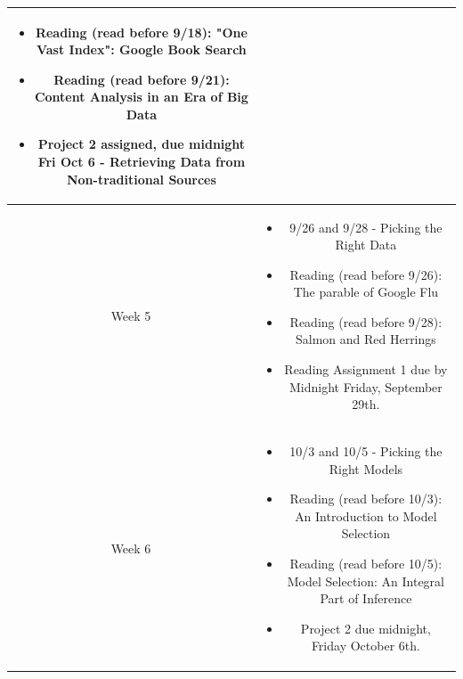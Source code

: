 \documentclass[11pt]{article}
\begin{document}
\begin{table}[h!]
\begin{tabular}{ | c | c | }
\begin{minipage}{.85\textwidth}
\begin{itemize}
	\item Reading (read before 9/18): "One Vast Index": Google Book Search 
	\item Reading (read before 9/21): Content Analysis in an Era of Big Data
		
	\item Project 2 assigned, due midnight Fri Oct 6 -  Retrieving Data from Non-traditional Sources
	\vspace{1mm}
\end{itemize}
\end{minipage} \\
\hline

Week 5 & \begin{minipage}{.85\textwidth}
\begin{itemize} \itemsep-0.4em
	\vspace{1mm}
	\item 9/26 and 9/28 - Picking the Right Data 
	
	\item Reading (read before 9/26): The parable of Google Flu
	\item Reading (read before 9/28): Salmon and Red Herrings
	

	\item Reading Assignment 1 due by Midnight Friday, September 29th.

	\vspace{1mm}
\end{itemize}
\end{minipage} \\
\hline


Week 6 & \begin{minipage}{.85\textwidth}
\begin{itemize} \itemsep-0.4em
	\vspace{1mm}
	\item 10/3 and 10/5 - Picking the Right Models

	\item Reading (read before 10/3): An Introduction to Model Selection
	\item Reading (read before 10/5): Model Selection: An Integral Part of Inference
	
	\item Project 2 due midnight, Friday October 6th.
	
	
	\vspace{1mm}
\end{itemize}
\end{minipage} \\
\hline


\end{tabular}
\end{table}
\end{document}
